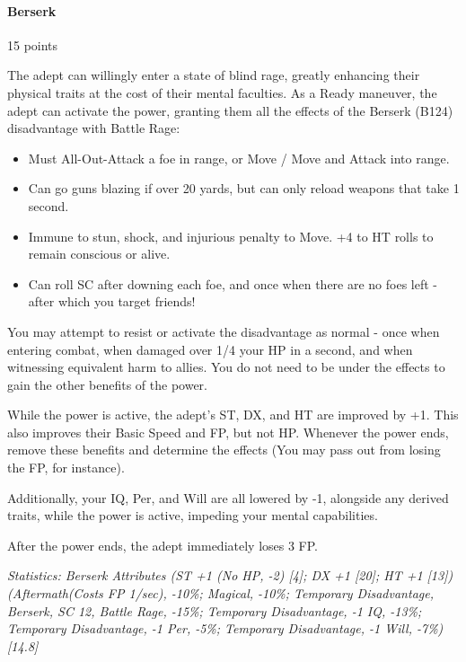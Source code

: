 \begin{multicols*}{3}
	
	\paragraph{Berserk}
	\begin{flushright}
		15 points
	\end{flushright}

	The adept can willingly enter a state of blind rage, greatly enhancing their physical traits at the cost of their mental faculties. As a Ready maneuver, the adept can activate the power, granting them all the effects of the Berserk (B124) disadvantage with Battle Rage:
	
	\begin{itemize}
		\itemsep 0pt
		\item Must All-Out-Attack a foe in range, or Move / Move and Attack into range.
		\item Can go guns blazing if over 20 yards, but can only reload weapons that take 1 second.
		\item Immune to stun, shock, and injurious penalty to Move. +4 to HT rolls to remain conscious or alive.
		\item Can roll SC after downing each foe, and once when there are no foes left - after which you target friends!
	\end{itemize}	

	You may attempt to resist or activate the disadvantage as normal - once when entering combat, when damaged over 1/4 your HP in a second, and when witnessing equivalent harm to allies. You do not need to be under the effects to gain the other benefits of the power.

	While the power is active, the adept's ST, DX, and HT are improved by +1. This also improves their Basic Speed and FP, but not HP. Whenever the power ends, remove these benefits and determine the effects (You may pass out from losing the FP, for instance).
	
	Additionally, your IQ, Per, and Will are all lowered by -1, alongside any derived traits, while the power is active, impeding your mental capabilities.
	
	After the power ends, the adept immediately loses 3 FP.
	
	\textcolor{OliveGreen}{\textit{Statistics: Berserk Attributes (ST +1 (No HP, -2) [4]; DX +1 [20]; HT +1 [13]) (Aftermath(Costs FP 1/sec), -10\%; Magical, -10\%; Temporary Disadvantage, Berserk, SC 12, Battle Rage, -15\%; Temporary Disadvantage, -1 IQ, -13\%; Temporary Disadvantage, -1 Per, -5\%; Temporary Disadvantage, -1 Will, -7\%) [14.8] }}
			

\end{multicols*}
